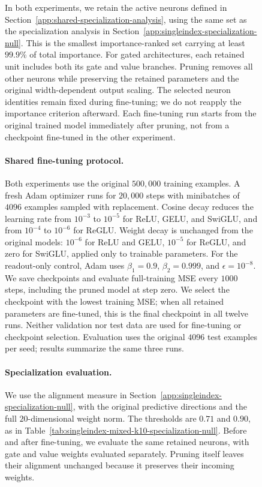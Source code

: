 \documentclass{article}
\newcounter{model}[section]
\begin{document}
\begin{figure}
In both experiments, we retain the active neurons defined in
Section~\ref{app:shared-specialization-analysis}, using the same set as
the specialization analysis in Section~\ref{app:singleindex-specialization-null}.
This is the smallest importance-ranked set carrying at least \(99.9\%\)
of total importance.
For gated architectures, each retained unit includes both its gate and
value branches. Pruning removes all other neurons while preserving the
retained parameters and the original width-dependent output scaling.
The selected neuron identities remain fixed during fine-tuning; we do not
reapply the importance criterion afterward.
Each fine-tuning run starts from the original trained model immediately
after pruning, not from a checkpoint fine-tuned in the other experiment.

\paragraph{Shared fine-tuning protocol.}
Both experiments use the original \(500{,}000\) training examples.
A fresh Adam optimizer runs
for \(20{,}000\) steps with minibatches of \(4096\) examples sampled with
replacement. Cosine decay reduces the learning rate from \(10^{-3}\) to
\(10^{-5}\) for ReLU, GELU, and SwiGLU, and from \(10^{-4}\) to \(10^{-6}\)
for ReGLU. Weight decay is unchanged from the original models:
\(10^{-6}\) for ReLU and GELU, \(10^{-5}\) for ReGLU, and zero for SwiGLU,
applied only to trainable parameters.
For the readout-only control, Adam uses
\(\beta_1=0.9\), \(\beta_2=0.999\), and \(\epsilon=10^{-8}\).
We save checkpoints and evaluate full-training MSE every \(1000\) steps,
including the pruned model at step zero. We select the checkpoint with
the lowest training MSE; when all retained parameters are fine-tuned,
this is the final checkpoint in all twelve runs.
Neither validation nor test data are used for fine-tuning or checkpoint
selection. Evaluation uses the original \(4096\) test examples per seed;
results summarize the same three runs.

\paragraph{Specialization evaluation.}
We use the alignment measure in
Section~\ref{app:singleindex-specialization-null}, with the original
predictive directions and the full \(20\)-dimensional weight norm.
The thresholds are \(0.71\) and \(0.90\), as in
Table~\ref{tab:singleindex-mixed-k10-specialization-null}.
Before and after fine-tuning, we evaluate the same retained neurons,
with gate and value weights evaluated separately. Pruning itself leaves
their alignment unchanged because it preserves their incoming weights.


\end{figure}
\end{document}
